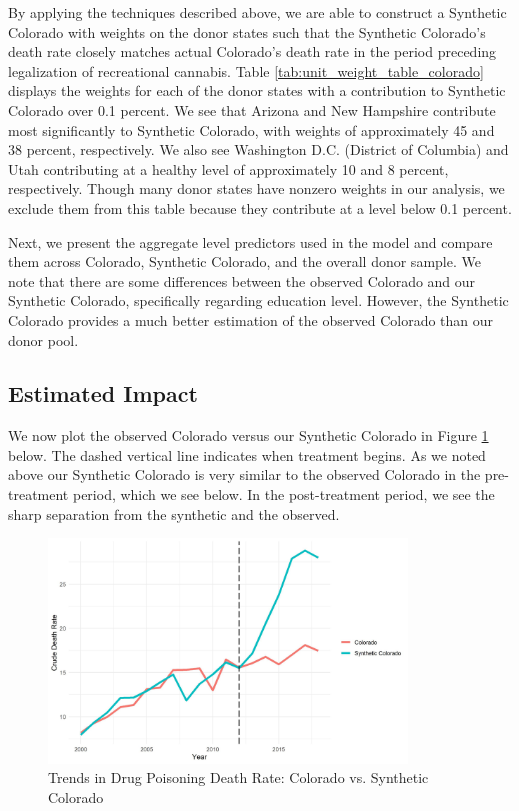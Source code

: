 \documentclass{article}
\begin{document}
By applying the techniques described above, we are able to construct a Synthetic Colorado with weights on the donor states such that the Synthetic Colorado's death rate closely matches actual Colorado's death rate in the period preceding legalization of recreational cannabis. Table \ref{tab:unit_weight_table_colorado} displays the weights for each of the donor states with a contribution to Synthetic Colorado over 0.1 percent. We see that Arizona and New Hampshire contribute most significantly to Synthetic Colorado, with weights of approximately 45 and 38 percent, respectively. We also see Washington D.C. (District of Columbia) and Utah contributing at a healthy level of approximately 10 and 8 percent, respectively. Though many donor states have nonzero weights in our analysis, we exclude them from this table because they contribute at a level below 0.1 percent.



Next, we present the aggregate level predictors used in the model and compare them across Colorado, Synthetic Colorado, and the overall donor sample. We note that there are some differences between the observed Colorado and our Synthetic Colorado, specifically regarding education level. However, the Synthetic Colorado provides a much better estimation of the observed Colorado than our donor pool. 



\subsection{Estimated Impact}

We now plot the observed Colorado versus our Synthetic Colorado in Figure \ref{fig:trends_plot_colorado} below. The dashed vertical line indicates when treatment begins. As we noted above our Synthetic Colorado is very similar to the observed Colorado in the pre-treatment period, which we see below. In the post-treatment period, we see the sharp separation from the synthetic and the observed. 

\begin{figure}[H]
	\begin{center}
		\includegraphics[width=0.85\textwidth]{trends_plot_colorado}
	\end{center}
	\caption{Trends in Drug Poisoning Death Rate: Colorado vs. Synthetic Colorado}
	\label{fig:trends_plot_colorado}
\end{figure}
\end{document}
